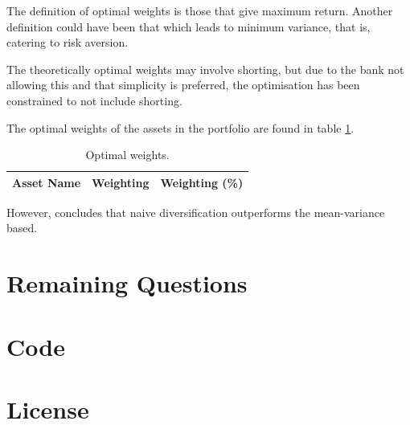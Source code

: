 \documentclass[a4paper]{article}
\begin{document}
The definition of optimal weights is those that give maximum return. Another definition could have been that which leads to minimum variance, that is, catering to risk aversion.

The theoretically optimal weights may involve shorting, but due to the bank not allowing this and that simplicity is preferred, the optimisation has been constrained to not include shorting.

The optimal weights of the assets in the portfolio are found in table \ref{table_optimal_weights}.

\begin{table}[H]
    \begin{center}
    \begin{tabular}{ |l|l|l| }
        \hline
        Asset Name & Weighting & Weighting (\%) \\
        \hline

        

        \hline
    \end{tabular}
    \caption{Optimal weights.}
    \label{table_optimal_weights}
    \end{center}
\end{table}

However, \citet{naive_div} concludes that naive diversification outperforms the mean-variance based.

\section{Remaining Questions}

\printbibliography

\appendix

\section{Code}



\section{License}

\doclicenseThis
\end{document}
